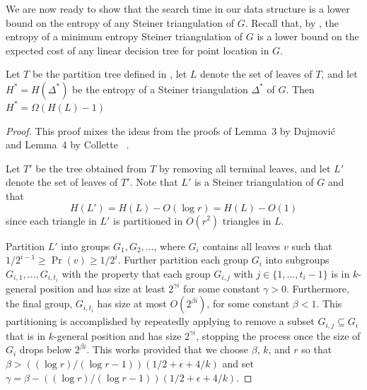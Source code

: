 \documentclass{patmorin}
\begin{document}
We are now ready to show that the search time in our data structure
is a lower bound on the entropy of any Steiner triangulation of $G$.
Recall that, by , the entropy of a minimum entropy
Steiner triangulation of $G$ is a lower bound on the expected cost of
any linear decision tree for point location in $G$.

\begin{lem}
  Let $T$ be the partition tree defined in ,
  let $L$ denote the set of leaves of $T$, and let $H^*=H(\Delta^*)$ be
  the entropy of a Steiner triangulation $\Delta^*$ of $G$.  Then $H^*
  = \Omega(H(L)-1)$
\end{lem}

\begin{proof}
  This proof mixes the ideas from the proofs of Lemma~3 by Dujmovi\'c
  \etal\ \cite{dhm09} and Lemma~4 by Collette \etal\ \cite{cdilm08}.

  Let $T'$ be the tree obtained from $T$ by removing all terminal leaves,
  and let $L'$ denote the set of leaves of $T'$.  Note that $L'$ is a Steiner
  triangulation of $G$ and that 
  \[  
     H(L') = H(L) - O(\log r) = H(L) - O(1)
  \]
  since each triangle in $L'$ is partitioned in $O(r^2)$ triangles in $L$. 

  Partition $L'$ into groups $G_1,G_2,\ldots$, where $G_i$
  contains all leaves $v$ such that $1/2^{i-1} \ge \Pr(v) \ge
  1/2^{i}$.  Further partition each group $G_i$ into subgroups
  $G_{i,1},\ldots,G_{i,t_i}$ with the property that each group $G_{i,j}$
  with $j\in\{1,\ldots,t_i-1\}$ is in $k$-general position and has size
  at least $2^{\gamma i}$ for some constant $\gamma > 0$. Furthermore,
  the final group, $G_{i,t_i}$ has size at most $O(2^{\beta i})$, for some
  constant $\beta < 1$.  This partitioning is accomplished by repeatedly
  applying  to remove a subset $G_{i,j}\subseteq
  G_{i}$ that is in $k$-general position and has size $2^{\gamma i}$,
  stopping the process once the size of $G_i$ drops below $2^{\beta
  i}$. This works provided that we choose $\beta$, $k$, and $r$ so
  that $\beta > ((\log r)/(\log r - 1))(1/2+\epsilon+4/k)$ and set
  $\gamma=\beta - ((\log r)/(\log r - 1))(1/2+\epsilon+4/k)$.


\end{proof}
\end{document}
